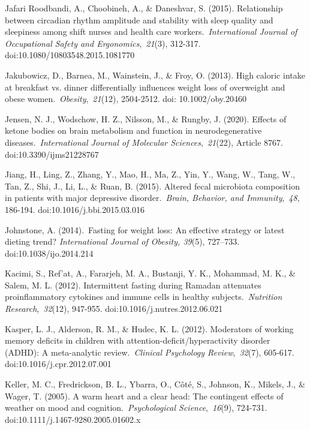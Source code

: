\documentclass[authordate, empirical]{jote-new-article}
\begin{document}
Jafari Roodbandi, A., Choobineh, A., \& Daneshvar, S. (2015). Relationship between circadian rhythm amplitude and stability with sleep quality and sleepiness among shift nurses and health care workers. \emph{International Journal of Occupational Safety and Ergonomics}, \emph{21}(3), 312-317. doi:10.1080/10803548.2015.1081770



Jakubowicz, D., Barnea, M., Wainstein, J., \& Froy, O. (2013). High caloric intake at breakfast vs. dinner differentially influences weight loss of overweight and obese women. \emph{Obesity}, \emph{21}(12), 2504-2512. doi: 10.1002/oby.20460



Jensen, N. J., Wodschow, H. Z., Nilsson, M., \& Rungby, J. (2020). Effects of ketone bodies on brain metabolism and function in neurodegenerative diseases. \emph{International Journal of Molecular Sciences}, \emph{21}(22), Article 8767. doi:10.3390/ijms21228767



Jiang, H., Ling, Z., Zhang, Y., Mao, H., Ma, Z., Yin, Y., Wang, W., Tang, W., Tan, Z., Shi, J., Li, L., \& Ruan, B. (2015). Altered fecal microbiota composition in patients with major depressive disorder. \emph{Brain, Behavior, and Immunity}, \emph{48}, 186-194. doi:10.1016/j.bbi.2015.03.016



Johnstone, A. (2014). Fasting for weight loss: An effective strategy or latest dieting trend?\emph{ International Journal of Obesity, 39}(5), 727--733. doi:10.1038/ijo.2014.214



Kacimi, S., Ref'at, A., Fararjeh, M. A., Bustanji, Y. K., Mohammad, M. K., \& Salem, M. L. (2012). Intermittent fasting during Ramadan attenuates proinflammatory cytokines and immune cells in healthy subjects. \emph{Nutrition Research}, \emph{32}(12), 947-955. doi:10.1016/j.nutres.2012.06.021



Kasper, L. J., Alderson, R. M., \& Hudec, K. L. (2012). Moderators of working memory deficits in children with attention-deficit/hyperactivity disorder (ADHD): A meta-analytic review. \emph{Clinical Psychology Review}, \emph{32}(7), 605-617. doi:10.1016/j.cpr.2012.07.001



Keller, M. C., Fredrickson, B. L., Ybarra, O., Côté, S., Johnson, K., Mikels, J., \& Wager, T. (2005). A warm heart and a clear head: The contingent effects of weather on mood and cognition. \emph{Psychological Science}, \emph{16}(9), 724-731. doi:10.1111/j.1467-9280.2005.01602.x
\end{document}
